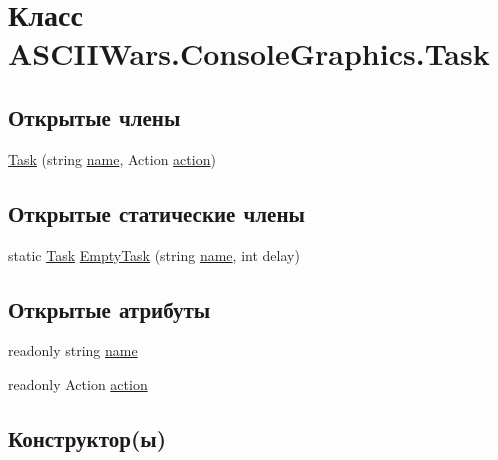 \hypertarget{class_a_s_c_i_i_wars_1_1_console_graphics_1_1_task}{}\section{Класс A\+S\+C\+I\+I\+Wars.\+Console\+Graphics.\+Task}
\label{class_a_s_c_i_i_wars_1_1_console_graphics_1_1_task}
\subsection*{Открытые члены}
\begin{DoxyCompactItemize}
\item 
\hyperlink{class_a_s_c_i_i_wars_1_1_console_graphics_1_1_task_a2fe2e33110134ec07ed7ad5960976c6a}{Task} (string \hyperlink{class_a_s_c_i_i_wars_1_1_console_graphics_1_1_task_a28591edbf75d92dcf956ce1c69a1e9ab}{name}, Action \hyperlink{class_a_s_c_i_i_wars_1_1_console_graphics_1_1_task_a9fcf12d48e7ae10b20db0828cedf4f7d}{action})
\end{DoxyCompactItemize}
\subsection*{Открытые статические члены}
\begin{DoxyCompactItemize}
\item 
static \hyperlink{class_a_s_c_i_i_wars_1_1_console_graphics_1_1_task}{Task} \hyperlink{class_a_s_c_i_i_wars_1_1_console_graphics_1_1_task_a199974d73498b9de5c95c3e90864a59b}{Empty\+Task} (string \hyperlink{class_a_s_c_i_i_wars_1_1_console_graphics_1_1_task_a28591edbf75d92dcf956ce1c69a1e9ab}{name}, int delay)
\end{DoxyCompactItemize}
\subsection*{Открытые атрибуты}
\begin{DoxyCompactItemize}
\item 
readonly string \hyperlink{class_a_s_c_i_i_wars_1_1_console_graphics_1_1_task_a28591edbf75d92dcf956ce1c69a1e9ab}{name}
\item 
readonly Action \hyperlink{class_a_s_c_i_i_wars_1_1_console_graphics_1_1_task_a9fcf12d48e7ae10b20db0828cedf4f7d}{action}
\end{DoxyCompactItemize}


\subsection{Конструктор(ы)}
\hypertarget{class_a_s_c_i_i_wars_1_1_console_graphics_1_1_task_a2fe2e33110134ec07ed7ad5960976c6a}{}\label{class_a_s_c_i_i_wars_1_1_console_graphics_1_1_task_a2fe2e33110134ec07ed7ad5960976c6a} 
